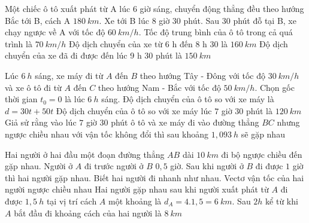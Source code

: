 \begin{ex}%
Một chiếc ô tô xuất phát từ A lúc 6 giờ sáng, chuyển động thẳng đều theo hướng Bắc tới B, cách A $180\ km$. Xe tới B lúc 8 giờ 30 phút. Sau 30 phút đỗ tại B, xe chạy ngược về A với tốc độ $60 \ km / h$.
{Tốc độ trung bình của ô tô trong cả quá trình là $70 \ km / h$} 
{Độ dịch chuyển của xe từ 6 h đến 8 h 30 là $160\ km$} 
{\True Độ dịch chuyển của xe đã đi được đến lúc 9 h 30 phút là $150\ km$} 
\loigiai{ 
\begin{itemchoice}
\itemch
\itemch
\itemch
\itemch
\end{itemchoice}
}
\end{ex}
\begin{ex}%
Lúc $6\ h$ sáng, xe máy đi từ $A$ đến $B$ theo hướng Tây - Đông với tốc độ $30 \ km/h$ và xe ô tô đi từ $A$ đến $C$ theo hướng Nam - Bắc với tốc độ $50 \ km/h$. Chọn gốc thời gian $t_0=0$ là lúc $6\ h$ sáng.
{Độ dịch chuyển của ô tô so với xe máy là $d=30 t+50 t$} 
{Độ dịch chuyển của ô tô so với xe máy lúc $7$ giờ $30$ phút là $120\ km$} 
{\True Giả sử rằng vào lúc $7$ giờ $30$ phút ô tô và xe máy đi vào đường thẳng $BC$ nhưng ngược chiều nhau với vận tốc không đổi thì sau khoảng $1,093 \ h$ sẽ gặp nhau} 
\loigiai{ 
\begin{itemchoice}
\itemch
\itemch
\itemch
\itemch
\end{itemchoice}
}
\end{ex}
\begin{ex}%
Hai người ở hai đầu một đoạn đường thẳng $AB$ dài $10\ km$ đi bộ ngược chiều đến gặp nhau. Người ở $A$ đi trước người ở $B$ $0,5$ giờ. Sau khi người ở $B$ đi được $1$ giờ thì hai người gặp nhau. Biết hai người đi nhanh như nhau.
{\True Vectơ vận tốc của hai người ngược chiều nhau} 
{\True Hai người gặp nhau sau khi người xuất phát từ $A$ đi được $1,5\ h$ tại vị trí cách $A$ một khoảng là $d_A = 4.1,5 = 6\ km$.} 
{Sau $2h$ kể từ khi $A$ bắt đầu đi khoảng cách của hai người là $8\ km$} 
\loigiai{ 
\begin{itemchoice}
\itemch
\itemch
\itemch
\itemch
\end{itemchoice}
}
\end{ex}
